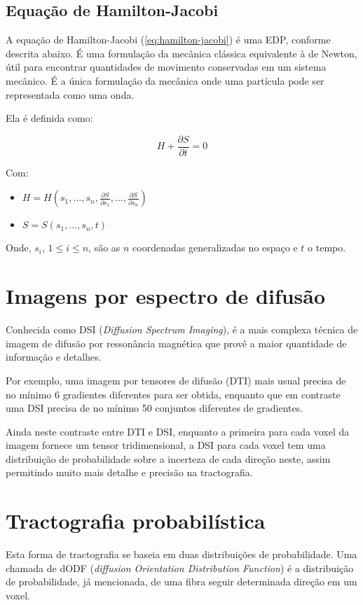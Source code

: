 \documentclass[a4paper,11pt]{report}
\begin{document}
    \subsection{Equação de Hamilton-Jacobi}
    A equação de Hamilton-Jacobi (\ref{eq:hamilton-jacobi}) é uma EDP, conforme descrita abaixo. É uma formulação da mecânica clássica equivalente à de Newton, útil para encontrar quantidades de movimento conservadas em um sistema mecânico. É a única formulação da mecânica onde uma partícula pode ser representada como uma onda.
    
    Ela é definida como: 

    \begin{equation} \label{eq:hamilton-jacobi}
      H + \frac{\partial S}{\partial t} = 0
    \end{equation}
    
    Com:
    
    \begin{itemize}
      \item $H = H(s_{1}, ..., s_{n}, \frac{\partial S}{\partial s_{1}}, ..., \frac{\partial S}{\partial s_{n}})$
      \item $S = S(s_{1}, ..., s_{n}, t)$
    \end{itemize}
    
    Onde, $s_{i}$, $1 \leq i \leq n$, são as $n$ coordenadas generalizadas no espaço e $t$ o tempo.
    
    
  \section{Imagens por espectro de difusão}
  Conhecida como DSI (\textit{Diffusion Spectrum Imaging}), é a mais complexa técnica de imagem de difusão por ressonância magnética que provê a maior quantidade de informação e detalhes.

  Por exemplo, uma imagem por tensores de difusão (DTI) mais usual precisa de no mínimo 6 gradientes diferentes para ser obtida, enquanto que em contraste uma DSI precisa de no mínimo 50 conjuntos diferentes de gradientes.

  Ainda neste contraste entre DTI e DSI, enquanto a primeira para cada voxel da imagem fornece um tensor tridimensional, a DSI para cada voxel tem uma distribuição de probabilidade sobre a incerteza de cada direção neste, assim permitindo muito mais detalhe e precisão na tractografia.

  \section{Tractografia probabilística}
  Esta forma de tractografia se baseia em duas distribuições de probabilidade. Uma chamada de dODF (\textit{diffusion Orientation Distribution Function}) é a distribuição de probabilidade, já mencionada, de uma fibra seguir determinada direção em um voxel.
  
\end{document}
